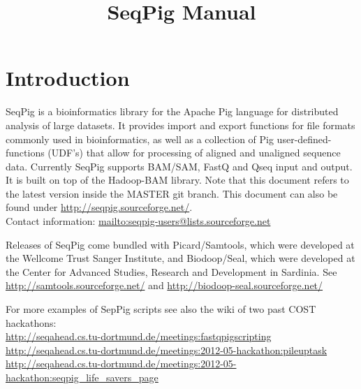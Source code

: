 \documentclass[a4paper,10pt,bibtotoc,abstracton,oneside,noindent,DIV15]{scrartcl}
\title{SeqPig Manual}
\begin{document}
\maketitle

\tableofcontents
\newpage

\section{Introduction}

SeqPig is a bioinformatics library for the Apache Pig language for
distributed analysis of large datasets. It provides import and export
functions for file formats commonly used in bioinformatics, as well as a
collection of Pig user-defined-functions (UDF's) that allow for processing
of aligned and unaligned sequence data. Currently SeqPig supports BAM/SAM,
FastQ and Qseq input and output. It is built on top of the Hadoop-BAM
library. Note that this document refers to the latest version inside the
MASTER git branch.
This document can also be found under \url{http://seqpig.sourceforge.net/}.\\
Contact information: \url{mailto:seqpig-users@lists.sourceforge.net}

Releases of SeqPig come bundled with Picard/Samtools, which were
developed at the Wellcome Trust Sanger Institute, and Biodoop/Seal, which
were developed
at the Center for Advanced Studies, Research and Development in Sardinia. See\\
\url{http://samtools.sourceforge.net/} and 
\url{http://biodoop-seal.sourceforge.net/}

For more examples of SepPig scripts see also the wiki of two past COST hackathons:\\
\url{http://seqahead.cs.tu-dortmund.de/meetings:fastqpigscripting}\\
\url{http://seqahead.cs.tu-dortmund.de/meetings:2012-05-hackathon:pileuptask}\\
\url{http://seqahead.cs.tu-dortmund.de/meetings:2012-05-hackathon:seqpig_life_savers_page}




\end{document}
